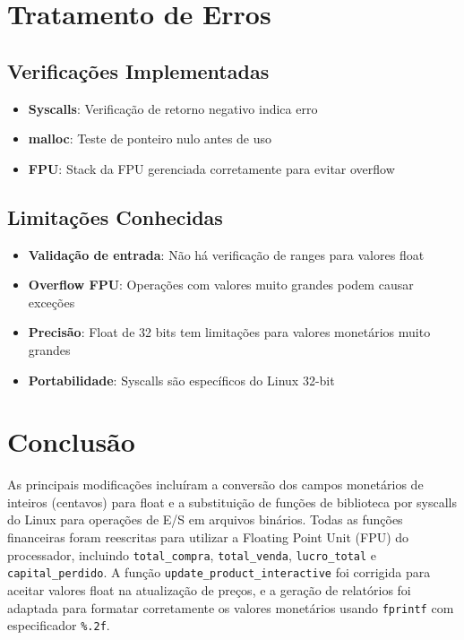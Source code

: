 \documentclass[12pt]{article}
\begin{document}
\section{Tratamento de Erros}

\subsection{Verificações Implementadas}
\begin{itemize}
    \item \textbf{Syscalls}: Verificação de retorno negativo indica erro
    \item \textbf{malloc}: Teste de ponteiro nulo antes de uso
    \item \textbf{FPU}: Stack da FPU gerenciada corretamente para evitar overflow
\end{itemize}

\subsection{Limitações Conhecidas}
\begin{itemize}
    \item \textbf{Validação de entrada}: Não há verificação de ranges para valores float
    \item \textbf{Overflow FPU}: Operações com valores muito grandes podem causar exceções
    \item \textbf{Precisão}: Float de 32 bits tem limitações para valores monetários muito grandes
    \item \textbf{Portabilidade}: Syscalls são específicos do Linux 32-bit
\end{itemize}

\section{Conclusão}
As principais modificações incluíram a conversão dos campos monetários de inteiros (centavos) para float e a substituição de funções de biblioteca por syscalls do Linux para operações de E/S em arquivos binários. Todas as funções financeiras foram reescritas para utilizar a Floating Point Unit (FPU) do processador, incluindo \texttt{total\_compra}, \texttt{total\_venda}, \texttt{lucro\_total} e \texttt{capital\_perdido}. A função \texttt{update\_product\_interactive} foi corrigida para aceitar valores float na atualização de preços, e a geração de relatórios foi adaptada para formatar corretamente os valores monetários usando \texttt{fprintf} com especificador \texttt{\%.2f}.
\end{document}
